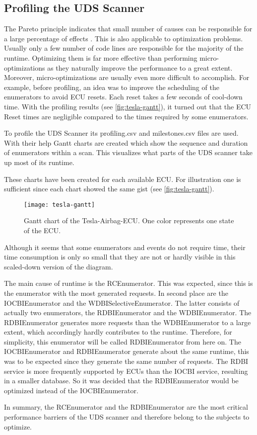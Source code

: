 \subsection{Profiling the UDS Scanner}

The Pareto principle indicates that small number of causes can be responsible for a large percentage of effects \cite{pareto}. This is also applicable to optimization problems. Usually only a few number of code lines are responsible for the majority of the runtime. Optimizing them is far more effective than performing micro-optimizations as they naturally improve the performance to a great extent. Moreover, micro-optimizations are usually even more difficult to accomplish. For example, before profiling, an idea was to improve the scheduling of the enumerators to avoid ECU resets. Each reset takes a few seconds of cool-down time. With the profiling results (see \autoref{fig:tesla-gantt}), it turned out that the ECU Reset times are negligible compared to the times required by some enumerators.

To profile the UDS Scanner its profiling.csv and milestones.csv files are used. With their help Gantt charts are created which show the sequence and duration of enumerators within a scan. This visualizes what parts of the UDS scanner take up most of its runtime.

These charts have been created for each available ECU. For illustration one is sufficient since each chart showed the same gist (see \autoref{fig:tesla-gantt}).

\begin{figure}[h]
    \centering
    \texttt{[image: tesla-gantt]}
    \caption{Gantt chart of the Tesla-Airbag-ECU. One color represents one state of the ECU.}
    \label{fig:tesla-gantt}
\end{figure}

Although it seems that some enumerators and events do not require time, their time consumption is only so small that they are not or hardly visible in this scaled-down version of the diagram.

The main cause of runtime is the RCEnumerator. This was expected, since this is the enumerator with the most generated requests. In second place are the IOCBIEnumerator and the WDBISelectiveEnumerator. The latter consists of actually two enumerators, the RDBIEnumerator and the WDBIEnumerator. The RDBIEnumerator generates more requests than the WDBIEnumerator to a large extent, which accordingly hardly contributes to the runtime. Therefore, for simplicity, this enumerator will be called RDBIEnumerator from here on.
The IOCBIEnumerator and RDBIEnumerator generate about the same runtime, this was to be expected since they generate the same number of requests. The RDBI service is more frequently supported by ECUs than the IOCBI service, resulting in a smaller database. So it was decided that the RDBIEnumerator would be optimized instead of the IOCBIEnumerator.

In summary, the RCEnumerator and the RDBIEnumerator are the most critical performance barriers of the UDS scanner and therefore belong to the subjects to optimize.
